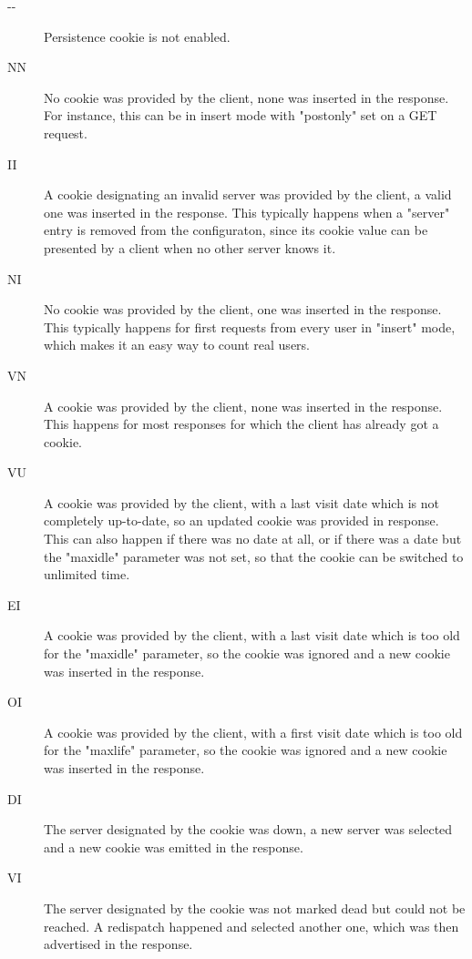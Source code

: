 \begin{description}
     \item[{-}{-}]
          Persistence cookie is not enabled.
     \item[NN]
          No cookie was provided by the client, none was inserted in the
          response. For instance, this can be in insert mode with "postonly"
          set on a GET request.
     \item[II]
          A cookie designating an invalid server was provided by the client,
          a valid one was inserted in the response. This typically happens when
          a "server" entry is removed from the configuraton, since its cookie
          value can be presented by a client when no other server knows it.
     \item[NI]
          No cookie was provided by the client, one was inserted in the
          response. This typically happens for first requests from every user
          in "insert" mode, which makes it an easy way to count real users.
     \item[VN]
          A cookie was provided by the client, none was inserted in the
          response. This happens for most responses for which the client has
          already got a cookie.
     \item[VU]
          A cookie was provided by the client, with a last visit date which is
          not completely up-to-date, so an updated cookie was provided in
          response. This can also happen if there was no date at all, or if
          there was a date but the "maxidle" parameter was not set, so that the
          cookie can be switched to unlimited time.
     \item[EI]
          A cookie was provided by the client, with a last visit date which is
          too old for the "maxidle" parameter, so the cookie was ignored and a
          new cookie was inserted in the response.
     \item[OI]
          A cookie was provided by the client, with a first visit date which is
          too old for the "maxlife" parameter, so the cookie was ignored and a
          new cookie was inserted in the response.
     \item[DI]
          The server designated by the cookie was down, a new server was
          selected and a new cookie was emitted in the response.
     \item[VI]
          The server designated by the cookie was not marked dead but could not
          be reached. A redispatch happened and selected another one, which was
          then advertised in the response.
\end{description}


